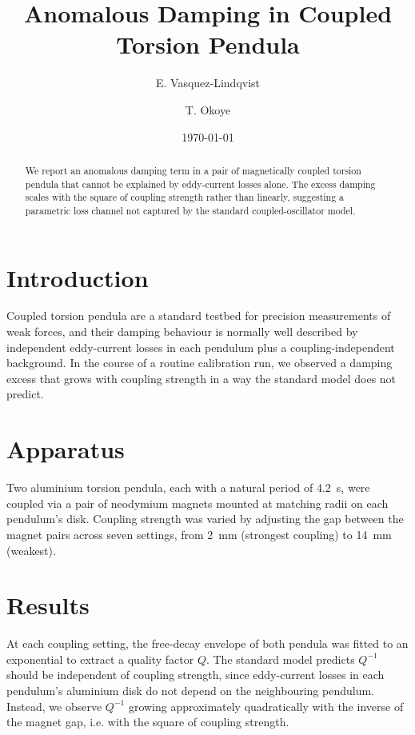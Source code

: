 \documentclass{article}
\title{Anomalous Damping in Coupled Torsion Pendula}
\author[1]{E. Vasquez-Lindqvist\email{e.vasquez@example.edu}}
\author[1,2]{T. Okoye}
\affil[1]{Department of Applied Physics, Whitmore Institute}
\affil[2]{Now at the National Metrology Laboratory}
\date{\today}
\begin{document}
\maketitle

\begin{abstract}
We report an anomalous damping term in a pair of magnetically
coupled torsion pendula that cannot be explained by eddy-current
losses alone. The excess damping scales with the square of coupling
strength rather than linearly, suggesting a parametric loss channel
not captured by the standard coupled-oscillator model.
\end{abstract}

\section{Introduction}

Coupled torsion pendula are a standard testbed for precision
measurements of weak forces, and their damping behaviour is normally
well described by independent eddy-current losses in each pendulum
plus a coupling-independent background. In the course of a routine
calibration run, we observed a damping excess that grows with
coupling strength in a way the standard model does not predict.

\section{Apparatus}

Two aluminium torsion pendula, each with a natural period of
\SI{4.2}{\second}, were coupled via a pair of neodymium magnets
mounted at matching radii on each pendulum's disk. Coupling strength
was varied by adjusting the gap between the magnet pairs across
seven settings, from \SI{2}{\milli\meter} (strongest coupling) to
\SI{14}{\milli\meter} (weakest).

\section{Results}

At each coupling setting, the free-decay envelope of both pendula was
fitted to an exponential to extract a quality factor $Q$. The
standard model predicts $Q^{-1}$ should be independent of coupling
strength, since eddy-current losses in each pendulum's aluminium disk
do not depend on the neighbouring pendulum. Instead, we observe
$Q^{-1}$ growing approximately quadratically with the inverse of the
magnet gap, i.e. with the square of coupling strength.
\end{document}
